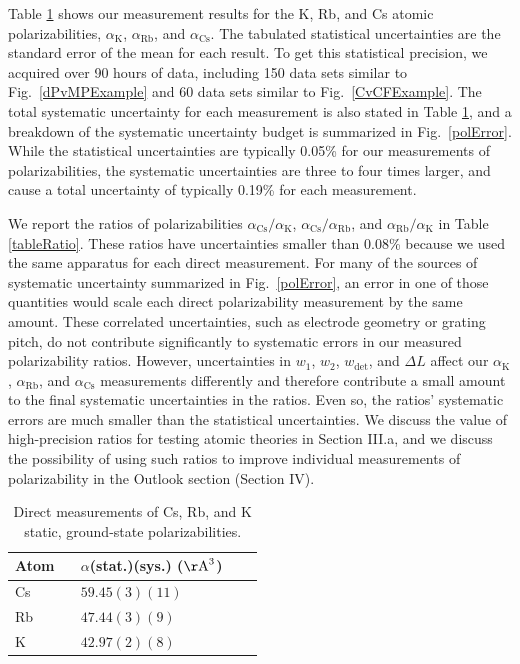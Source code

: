 \documentclass[twocolumn,pra,showpacs,superscriptaddress,longbibliography]{revtex4-1}   %
\newcommand{\sspace}{$\enspace$}
\newcommand{\figref}[1]{Fig.~\ref{#1}}
\newcommand{\ak}{\alpha_{\textrm{K}}}
\newcommand{\arb}{\alpha_{\textrm{Rb}}}
\newcommand{\acs}{\alpha_{\textrm{Cs}}}
\newcommand{\polK}{42.97(2)(8)}
\newcommand{\polRb}{47.44(3)(9)}
\newcommand{\polCs}{59.45(3)(11)}
\newcommand{\AAA}{\mathrm{\AA}}
\begin{document}
Table \ref{tableAbs} shows our measurement results for the K, Rb, and Cs atomic polarizabilities, $\ak$, $\arb$, and $\acs$.  The tabulated statistical uncertainties are the standard error of the mean for each result.  To get this statistical precision, we acquired over 90 hours of data, including 150 data sets similar to \figref{dPvMPExample} and 60 data sets similar to \figref{CvCFExample}.   The total systematic uncertainty for each measurement is also stated in Table \ref{tableAbs}, and a breakdown of the systematic uncertainty budget is summarized in \figref{polError}.  While the statistical uncertainties are typically 0.05\% for our measurements of polarizabilities, the systematic uncertainties are three to four times larger, and cause a total uncertainty of typically 0.19\% for each measurement.

We report the ratios of polarizabilities $\acs/\ak$, $\acs/\arb$, and $\arb/\ak$ in Table \ref{tableRatio}.
These ratios have uncertainties smaller than 0.08\% because we used the same apparatus for each direct measurement.
For many of the sources of systematic uncertainty summarized in \figref{polError}, an error in one of those quantities would scale each direct polarizability measurement by the same amount. These correlated uncertainties, such as electrode geometry or grating pitch, do not contribute significantly to systematic errors in our measured polarizability ratios.
However, uncertainties in $w_1$, $w_2$, $w_{\mathrm{det}}$, and $\Delta L$ affect our $\ak$, $\arb$, and $\acs$ measurements differently and therefore contribute a small amount to the final systematic uncertainties in the ratios. Even so, the ratios' systematic errors are much smaller than the statistical uncertainties. 
We discuss the value of high-precision ratios for testing atomic theories in Section III.a, and we discuss the possibility of using such ratios to improve individual measurements of polarizability in the Outlook section (Section IV).

\begingroup
\begin{table}
\caption{\label{tableAbs}Direct measurements of Cs, Rb, and K static, ground-state polarizabilities.}
\begin{center}
\begin{tabular}{llll}
\hline\hline
Atom \sspace & $\alpha$(stat.)(sys.) ($\AAA^3$) \\
\hline
Cs & $\polCs$ \\
Rb & $\polRb$ \\
K  & $\polK$ \\
\hline\hline
\end{tabular}
\end{center}
\end{table}
\endgroup
\end{document}
